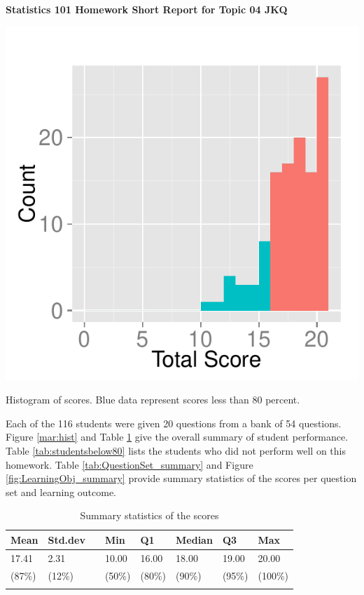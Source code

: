 \documentclass[12pt,english,nohyper]{tufte-handout}\usepackage[]{graphicx}\usepackage[]{color}
\begin{document}
\centerline{\Large\bf Statistics 101 Homework Short Report for Topic 04 JKQ}
\vspace{1cm}

\begin{marginfigure}
\includegraphics[width=0.98\linewidth]{Topic04_JKQ_score}
\caption{\label{mar:hist}Histogram of scores. Blue data represent scores less than 80 percent.}
\end{marginfigure}

Each of the 116 students were given 20 questions from a bank of 54 questions. Figure \ref{mar:hist} and Table \ref{tab:summary} give the overall summary of student performance. Table \ref{tab:studentsbelow80} lists the students who did not perform well on this homework. Table \ref{tab:QuestionSet_summary} and Figure \ref{fig:LearningObj_summary} provide summary statistics of the scores per question set and learning outcome.
\bigskip{}

\begin{longtable}{llllllll}
  \hline
Mean & Std.dev &   & Min & Q1 & Median & Q3 & Max \\ 
  \hline
17.41 & 2.31 &  & 10.00 & 16.00 & 18.00 & 19.00 & 20.00 \\ 
  (87\%) & (12\%) &  & (50\%) & (80\%) & (90\%) & (95\%) & (100\%) \\ 
   \hline
\hline
\caption{Summary statistics of the scores} 
\label{tab:summary}
\end{longtable}
\end{document}
